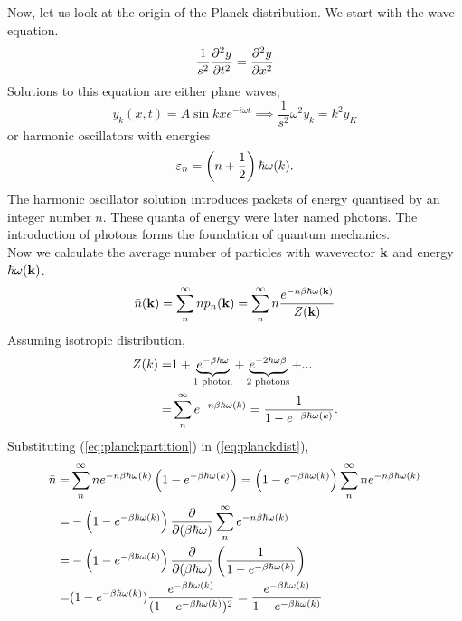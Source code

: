  Now, let us look at the origin of the Planck distribution. We start with the wave equation.
 \begin{equation}
    \frac{1}{s^2}\frac{\partial ^2y}{\partial t^2}=\frac{\partial ^2y}{\partial x^2}
 \end{equation}
 Solutions to this equation are either plane waves,
 \begin{equation}
    y_k(x,t) = A\sin kxe^{-i\omega t} \implies \frac{1}{s^2}\omega^2\ddot{y}_k = k^2y_K
 \end{equation}
 or harmonic oscillators with energies
 \begin{equation}
    \varepsilon_n = \left( n+\frac{1}{2} \right)\hbar\omega(k).
 \end{equation}
 The harmonic oscillator solution introduces packets of energy quantised by an integer number $n$. These quanta of energy were later named photons. The introduction of photons forms the foundation of quantum mechanics. \\
 Now we calculate the average number of particles with wavevector $\mathbf{k}$ and energy $\hbar\omega(\mathbf{k})$.
 \begin{equation}
    \bar{n}(\mathbf{k}) = \sum_n^\infty np_n(\mathbf{k})=\sum_n^\infty n\frac{e^{-n\beta\hbar\omega(\mathbf{k})}}{Z(\mathbf{k})}
    \label{eq:planckdist}
 \end{equation}
 Assuming isotropic distribution,
\begin{align}
    Z(k) =& 1 + \underbrace{e^{-\beta\hbar\omega}}_\text{1 photon} + \underbrace{e^{-2\hbar\omega\beta}}_\text{2 photons} + ... \notag\\
    =& \sum_n^\infty e^{-n\beta\hbar\omega(k)} = \frac{1}{1-e^{-\beta\hbar\omega(k)}}. 
    \label{eq:planckpartition}
\end{align}
Substituting (\ref{eq:planckpartition}) in (\ref{eq:planckdist}),
\begin{align}
    \bar{n} =& \sum_n^\infty ne^{-n\beta\hbar\omega(k)}\left( 1-e^{-\beta\hbar\omega(k)} \right) = \left( 1-e^{-\beta\hbar\omega(k)} \right)\sum_n^\infty  ne^{-n\beta\hbar\omega(k)} \notag\\
            =& -\left( 1-e^{-\beta\hbar\omega(k)} \right)\frac{\partial }{\partial (\beta\hbar\omega)}\sum_n^\infty e^{-n\beta\hbar\omega(k)}\notag\\
            =& -\left( 1-e^{-\beta\hbar\omega(k)} \right)\frac{\partial }{\partial (\beta\hbar\omega)}\left( \frac{1}{1-e^{-\beta\hbar\omega(k)}} \right)\notag\\
            =& (1-e^{-\beta\hbar\omega(k)})\frac{e^{-\beta\hbar\omega(k)}}{(1-e^{-\beta\hbar\omega(k)})^2} = \frac{e^{-\beta\hbar\omega(k)}}{1-e^{-\beta\hbar\omega(k)}}
\end{align}
